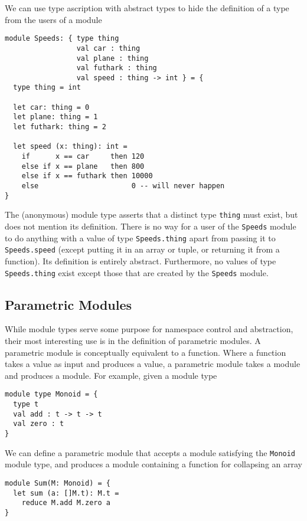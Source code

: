 \documentclass[oneside,11pt]{book}
\begin{document}
We can use type ascription with abstract types to hide the definition
of a type from the users of a module

\begin{lstlisting}
module Speeds: { type thing
                 val car : thing
                 val plane : thing
                 val futhark : thing
                 val speed : thing -> int } = {
  type thing = int

  let car: thing = 0
  let plane: thing = 1
  let futhark: thing = 2

  let speed (x: thing): int =
    if      x == car     then 120
    else if x == plane   then 800
    else if x == futhark then 10000
    else                      0 -- will never happen
}
\end{lstlisting}

The (anonymous) module type asserts that a distinct type \texttt{thing}
must exist, but does not mention its definition.  There is no way for
a user of the \texttt{Speeds} module to do anything with a value of type
\texttt{Speeds.thing} apart from passing it to \texttt{Speeds.speed} (except
putting it in an array or tuple, or returning it from a function).
Its definition is entirely abstract.  Furthermore, no values of type
\texttt{Speeds.thing} exist except those that are created by the \texttt{Speeds}
module.

\subsection{Parametric Modules}

While module types serve some purpose for namespace control and
abstraction, their most interesting use is in the definition of
parametric modules.  A parametric module is conceptually
equivalent to a function.  Where a function takes a value as input and
produces a value, a parametric module takes a module and produces a
module.  For example, given a module type

\begin{lstlisting}
module type Monoid = {
  type t
  val add : t -> t -> t
  val zero : t
}
\end{lstlisting}

We can define a parametric module that accepts a module satisfying
the \texttt{Monoid} module type, and produces a module containing a
function for collapsing an array

\begin{lstlisting}
module Sum(M: Monoid) = {
  let sum (a: []M.t): M.t =
    reduce M.add M.zero a
}
\end{lstlisting}
\end{document}
